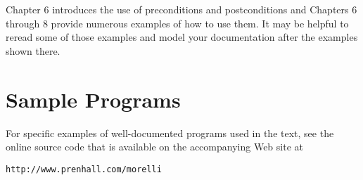Chapter 6 introduces the use of preconditions and postconditions and
Chapters 6 through 8 provide numerous examples of how to use them.  It
may be helpful to reread some of those examples and model your
documentation after the examples shown there.


\section*{Sample Programs}
\label{sample-programs}
\noindent For specific examples of well-documented programs used in
the text, see the online source code that is available on the
accompanying Web site at

\begin{jjjlisting}
\begin{lstlisting}[commentstyle=\color{black}]
http://www.prenhall.com/morelli
\end{lstlisting}
\end{jjjlisting}
%
